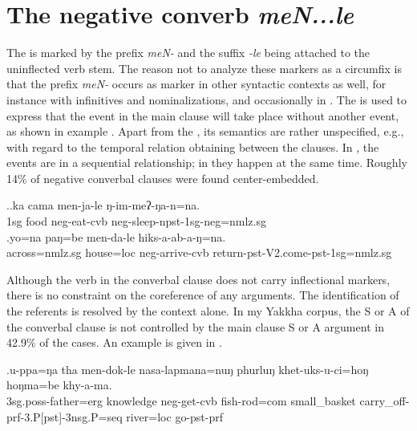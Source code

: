 	
\section{The negative converb \emph{meN...le}}\label{menle}

The  is marked by the prefix \emph{meN-} and the suffix \emph{-le} being attached to the uninflected verb stem. The reason not to analyze these markers as a circumfix is that the prefix \emph{meN-} occurs as  marker in other syntactic contexts as well, for instance with infinitives and nominalizations, and occasionally in . The  is used to express that the event in the main clause will take place without another event, as shown in example \Next. Apart from the , its semantics are rather unspecified, e.g., with regard to the temporal relation obtaining between the clauses. In \Next, the events are in a sequential relationship; in \NNext they happen at the same time. Roughly 14\% of negative converbal clauses were found center-embedded.
	
	\ex.\ag.\label{menjale}ka cama men-ja-le ŋ-im-meʔ-ŋa-n=na.\\
	{\sc 1sg} food   {\sc neg-}eat{\sc -cvb} {\sc neg-}sleep{\sc -npst-1sg-neg=nmlz.sg}\\
	\bg.yo=na paŋ=be men-da-le hiks-a-ab-a-ŋ=na.\\
across{\sc =nmlz.sg} house{\sc =loc} {\sc neg}-arrive-{\sc cvb} return{\sc -pst-V2.come-pst-1sg=nmlz.sg}\\

Although the verb in the converbal clause does not carry inflectional markers, there is no constraint on the coreference of any arguments. The identification of the referents is resolved by the context alone. In my Yakkha corpus, the S or A of the converbal clause is not controlled by the main clause S or A argument in  42.9\% of the cases. An example is given in \Next.

\exg.u-ppa=ŋa tha men-dok-le nasa-lapmana=nuŋ phurluŋ khet-uks-u-ci=hoŋ hoŋma=be    khy-a-ma.\\
	{\sc 3sg.poss-}father={\sc erg} knowledge {\sc neg}-get-{\sc cvb} fish-rod{\sc =com}  small\_basket carry\_off{\sc -prf-3.P[pst]-3nsg.P=seq} river={\sc loc} go{\sc [3sg]-pst-prf}\\
		 


